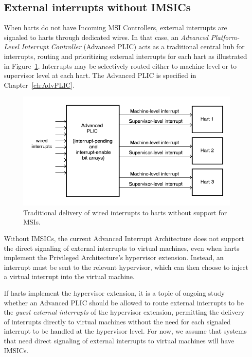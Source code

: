\subsection{External interrupts without IMSICs}

When {\RISCV} harts do not have Incoming MSI Controllers, external
interrupts are signaled to harts through dedicated wires.
In that case, an \emph{Advanced Platform-Level Interrupt Controller}
(Advanced PLIC) acts as a traditional central hub for interrupts,
routing and prioritizing external interrupts for each hart as
illustrated in Figure~\ref{fig:intrsWithoutIMSICs}.
Interrupts may be selectively routed either to machine level or to
supervisor level at each hart.
The Advanced PLIC is specified in Chapter~\ref{ch:AdvPLIC}.

\begin{figure}[th]
\centerline{\includegraphics[scale=0.55]{intrsWithoutIMSICs.png}}
\caption{%
Traditional delivery of wired interrupts to harts without support for
MSIs.%
}
\label{fig:intrsWithoutIMSICs}
\end{figure}

Without IMSICs, the current Advanced Interrupt Architecture does
not support the direct signaling of external interrupts to virtual
machines, even when {\RISCV} harts implement the Privileged
Architecture's hypervisor extension.
Instead, an interrupt must be sent to the relevant hypervisor, which
can then choose to inject a virtual interrupt into the virtual machine.

\begin{commentary}
If harts implement the hypervisor extension, it is a topic of ongoing
study whether an Advanced PLIC should be allowed to route external
interrupts to be the \emph{guest external interrupts} of the hypervisor
extension, permitting the delivery of interrupts directly to virtual
machines without the need for each signaled interrupt to be handled at
the hypervisor level.
For now, we assume that systems that need direct signaling of external
interrupts to virtual machines will have IMSICs.
\end{commentary}

